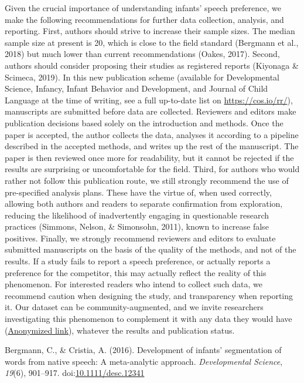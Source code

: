 \documentclass[man,floatsintext]{apa6}
\begin{document}
Given the crucial importance of understanding infants' speech
preference, we make the following recommendations for further data
collection, analysis, and reporting. First, authors should strive to
increase their sample sizes. The median sample size at present is 20,
which is close to the field standard (Bergmann et al., 2018) but much
lower than current recommendations (Oakes, 2017). Second, authors should
consider proposing their studies as registered reports (Kiyonaga \&
Scimeca, 2019). In this new publication scheme (available for
Developmental Science, Infancy, Infant Behavior and Development, and
Journal of Child Language at the time of writing, see a full up-to-date
list on \url{https://cos.io/rr/}), manuscripts are submitted before data
are collected. Reviewers and editors make publication decisions based
solely on the introduction and methods. Once the paper is accepted, the
author collects the data, analyses it according to a pipeline described
in the accepted methods, and writes up the rest of the manuscript. The
paper is then reviewed once more for readability, but it cannot be
rejected if the results are surprising or uncomfortable for the field.
Third, for authors who would rather not follow this publication route,
we still strongly recommend the use of pre-specified analysis plans.
These have the virtue of, when used correctly, allowing both authors and
readers to separate confirmation from exploration, reducing the
likelihood of inadvertently engaging in questionable research practices
(Simmons, Nelson, \& Simonsohn, 2011), known to increase false
positives. Finally, we strongly recommend reviewers and editors to
evaluate submitted manuscripts on the basis of the quality of the
methods, and not of the results. If a study fails to report a speech
preference, or actually reports a preference for the competitor, this
may actually reflect the reality of this phenomenon. For interested
readers who intend to collect such data, we recommend caution when
designing the study, and transparency when reporting it. Our dataset can
be community-augmented, and we invite researchers investigating this
phenomenon to complement it with any data they would have
(\href{https://osf.io/4stz9/?view_only=d0696591ebf34bfc8430f848cd945ca8}{Anonymized
link}), whatever the results and publication status.

\newpage

\begingroup
\setlength{\parindent}{-0.5in} \setlength{\leftskip}{0.5in}

\hypertarget{refs}{}
\hypertarget{ref-bergmann_development_2016}{}
Bergmann, C., \& Cristia, A. (2016). Development of infants'
segmentation of words from native speech: A meta-analytic approach.
\emph{Developmental Science}, \emph{19}(6), 901--917.
doi:\href{https://doi.org/10.1111/desc.12341}{10.1111/desc.12341}
\end{document}
